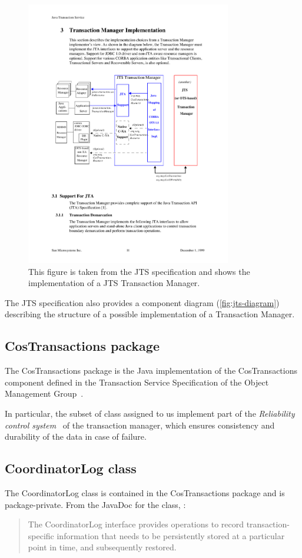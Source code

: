\begin{figure}
\centering
\includegraphics[width=0.8\textwidth]{figures/JTSDiagram}
\caption{This figure is taken from the JTS specification and shows the implementation of a JTS Transaction Manager.}
\label{fig:jts-diagram}
\end{figure}

The JTS specification also provides a component diagram (\autoref{fig:jts-diagram}) describing the structure of a possible implementation of a Transaction Manager.

\subsection{CosTransactions package}
The CosTransactions package is the Java implementation of the CosTransactions component defined in the Transaction Service Specification of the Object Management Group~\cite{omg-ots}.

In particular, the subset of class assigned to us implement part of the \emph{Reliability control system}~\cite[p.~311]{ceri-dbbook} of the transaction manager, which ensures consistency and durability of the data in case of failure.

\subsection{CoordinatorLog class}
The CoordinatorLog class is contained in the CosTransactions package and is package-private. From the JavaDoc for the class, :
\begin{quote}
    The CoordinatorLog interface provides operations to record transaction-specific information that needs to be persistently stored at a particular point in time, and subsequently restored.
\end{quote}

